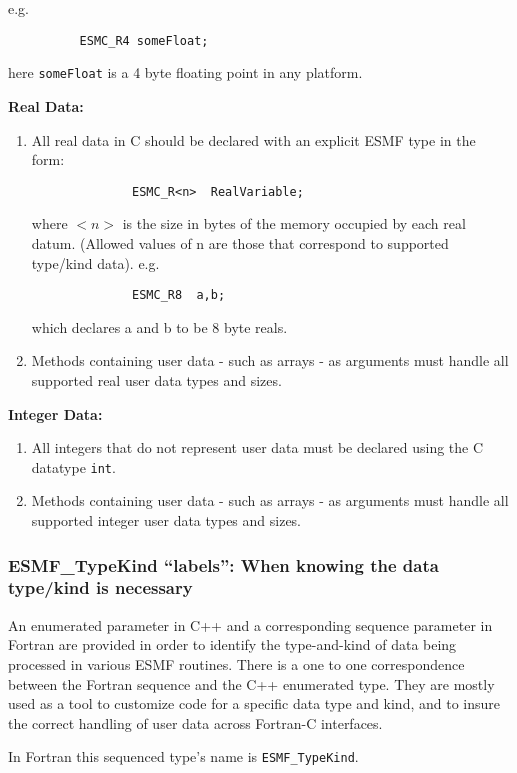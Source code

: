 e.g.
\begin{verbatim}
          ESMC_R4 someFloat;
\end{verbatim}
here {\tt someFloat} is a 4 byte floating point in any platform.

{\bf Real Data:}
\begin{enumerate}
\item All real data in C should be declared with an explicit ESMF type in the form:
\begin{verbatim}
              ESMC_R<n>  RealVariable;
\end{verbatim}
      where $<n>$ is the size in bytes of the memory occupied by each real datum. (Allowed values of n are those that correspond to supported type/kind data). e.g.
\begin{verbatim}
              ESMC_R8  a,b;
\end{verbatim}
      which declares a and b to be 8 byte reals.

\item Methods containing user data - such as arrays - as arguments must handle all supported real user data types and sizes.
\end{enumerate}

{\bf Integer Data:}
\begin{enumerate}
\item All integers that do not represent user data must be declared using the C datatype {\tt int}.

\item Methods containing user data - such as arrays - as arguments must handle all supported integer user data types and sizes.
\end{enumerate}

\subsubsection{ESMF\_TypeKind ``labels'': When knowing the data type/kind is necessary}

An enumerated parameter in C++ and a corresponding sequence parameter in Fortran are provided in order to identify the type-and-kind of data being processed in various ESMF routines. There is a one to one correspondence between the Fortran sequence and the C++ enumerated type. They are mostly used as a tool to customize code for a specific data type and kind, and to insure the correct handling of user data across Fortran-C interfaces.

In Fortran this sequenced type's name is {\tt ESMF\_TypeKind}.

